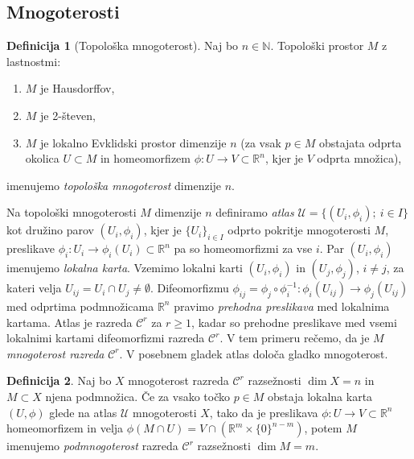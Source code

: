 \documentclass[12pt,a4paper,twoside]{article}
\theoremstyle{definition} %
\newtheorem{definicija}{Definicija}[section]
\theoremstyle{plain} %
\numberwithin{equation}{section}  %
\newcommand{\R}{\mathbb R}
\newcommand{\N}{\mathbb N}
\begin{document}
\subsection{Mnogoterosti}

\begin{definicija} [Topološka mnogoterost]
Naj bo $n \in \N$. Topološki prostor $M$ z lastnostmi:
\begin{enumerate}
\item $M$ je Hausdorffov,
\item $M$ je 2-števen,
\item $M$ je lokalno Evklidski prostor dimenzije $n$ (za vsak $p \in M$ obstajata odprta okolica $U \subset M$ in homeomorfizem $\phi \colon U \to V \subset \R^{n}$, kjer je $V$ odprta množica),
\end{enumerate}
imenujemo \emph{topološka mnogoterost} dimenzije $n$.
\end{definicija}

Na topološki mnogoterosti $M$ dimenzije $n$ definiramo \emph{atlas} $\mathcal{U} = \{ (U_{i}, \phi_{i}) ; \ i \in I \}$ kot družino parov $(U_{i}, \phi_{i})$, kjer je $\{ U_{i} \}_{i \in I}$ odprto pokritje mnogoterosti $M$, preslikave $\phi_{i} \colon U_{i} \to \phi_{i}(U_{i}) \subset \R^{n}$ pa so homeomorfizmi za vse $i$. Par $(U_{i}, \phi_{i})$ imenujemo \emph{lokalna karta}.
Vzemimo lokalni karti $(U_{i}, \phi_{i})$ in $(U_{j}, \phi_{j})$, $i \neq j$, za kateri velja $U_{ij}=U_{i} \cap U_{j} \neq \emptyset$. Difeomorfizmu $\phi_{ij} = \phi_{j} \circ \phi_{i}^{-1} \colon \phi_{i}(U_{ij}) \to \phi_{j}(U_{ij})$ med odprtima podmnožicama $\R^{n}$ pravimo \emph{prehodna preslikava} med lokalnima kartama. Atlas je razreda $\mathcal{C}^{r}$ za $r \geq 1$, kadar so prehodne preslikave med vsemi lokalnimi kartami difeomorfizmi razreda $\mathcal{C}^{r}$. V tem primeru rečemo, da je $M$ \emph{mnogoterost razreda} $\mathcal{C}^{r}$.
V posebnem gladek atlas določa gladko mnogoterost.

\begin{definicija}
Naj bo $X$ mnogoterost razreda $\mathcal{C}^{r}$ razsežnosti $\dim X = n$ in $M \subset X$ njena podmnožica. Če za vsako točko $p \in M$ obstaja lokalna karta $(U, \phi)$ glede na atlas $\mathcal{U}$ mnogoterosti $X$, tako da je preslikava $\phi \colon U \to V \subset \mathbb{R}^{n}$ homeomorfizem in velja $\phi (M \cap U) = V \cap (\mathbb{R}^{m} \times \{0\}^{n-m})$, potem $M$ imenujemo \emph{podmnogoterost} razreda $\mathcal{C}^{r}$ razsežnosti $\dim M = m$.
\end{definicija}
\end{document}
